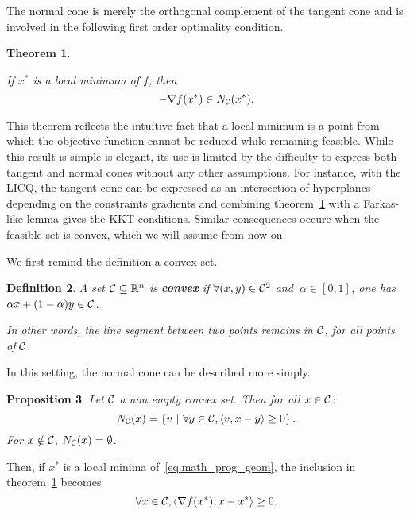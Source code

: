 \documentclass[10pt]{article}
\newtheorem{theorem}{Theorem}[]
\newtheorem{definition}[theorem]{Definition}
\newtheorem{proposition}[theorem]{Proposition}
\numberwithin{equation}{section}
\begin{document}
	The normal cone is merely the orthogonal complement of the tangent cone and is involved in the following first order optimality condition.
	
	\begin{theorem}\label{theo:first_order_normal_cone}
		
		If $x^*$ is a local minimum of $f$, then \[-\nabla f(x^*) \in N_{\mathcal{C}}(x^*).\]
	\end{theorem}
	
	This theorem reflects the intuitive fact that a local minimum is a point from which the objective function cannot be reduced while remaining feasible. While this result is simple is elegant, its use is limited by the difficulty to express both tangent and normal cones without any other assumptions. For instance, with the LICQ, the tangent cone can be expressed as an intersection of hyperplanes depending on the constraints gradients and combining theorem~\ref{theo:first_order_normal_cone} with a Farkas-like lemma gives the KKT conditions. Similar consequences occure when the feasible set is convex, which we will assume from now on.
	
	We first remind the definition a convex set.
	
	\begin{definition}
		A set ${\mathcal{C}}\subseteq {\mathbb{R}}^n$ is \textbf{convex} if \(\forall (x,y) \in {\mathcal{C}}^2\) and \(\ \alpha \in [0,1] \), one has \(\alpha x+ (1-\alpha)y \in {\mathcal{C}}\).
		
		In other words, the line segment between two points remains in ${\mathcal{C}}$, for all points of ${\mathcal{C}}$.
	\end{definition}
	
	In this setting, the normal cone can be described more simply.
	
	\begin{proposition}\label{prop:normal_set_convex}
		Let ${\mathcal{C}} $ a non empty convex set. Then for all $x \in {\mathcal{C}}$:
		\[N_{\mathcal{C}} (x) = \left\{v \ | \ \forall y \in {\mathcal{C}}, \left\langle {v} , {x-y} \right\rangle \ge 0\right\}.\]
		For $x \notin {\mathcal{C}}$, $N_{\mathcal{C}} (x) = \emptyset$.
	\end{proposition}
	
	Then, if $x^*$ is a local minima of~\eqref{eq:math_prog_geom}, the inclusion in theorem~\ref{theo:first_order_normal_cone}  becomes
	\begin{equation}\label{eq:fo_optimality_convex_set}
		\forall x \in {\mathcal{C}}, \left\langle {\nabla f(x^*)} , {x-x^*} \right\rangle \ge 0.
	\end{equation}
	
\end{document}
